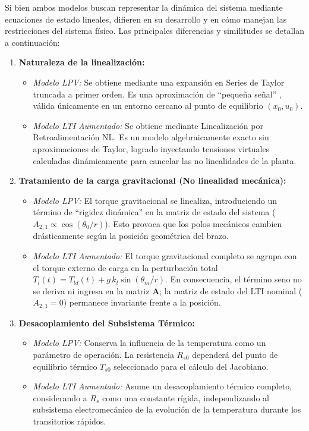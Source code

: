 \documentclass[12pt, a4paper,journal, onecolumn, compsoc]{IEEEtran}
\begin{document}
Si bien ambos modelos buscan representar la dinámica del sistema mediante ecuaciones de estado lineales, difieren en su desarrollo y en cómo manejan las restricciones del sistema físico. Las principales diferencias y similitudes se detallan a continuación:

\begin{enumerate}
    \item \textbf{Naturaleza de la linealización:}
    \begin{itemize}
        \item \textit{Modelo LPV:} Se obtiene mediante una expansión en Series de Taylor truncada a primer orden. Es una aproximación de ``pequeña señal'' \cite{franklin_feedback}, válida únicamente en un entorno cercano al punto de equilibrio $(x_0, u_0)$.
        \item \textit{Modelo LTI Aumentado:} Se obtiene mediante Linealización por Retroalimentación NL. Es un modelo algebraicamente exacto sin aproximaciones de Taylor, logrado inyectando tensiones virtuales calculadas dinámicamente para cancelar las no linealidades de la planta.
    \end{itemize}
    
    \item \textbf{Tratamiento de la carga gravitacional (No linealidad mecánica):}
    \begin{itemize}
        \item \textit{Modelo LPV:} El torque gravitacional se linealiza, introduciendo un término de ``rigidez dinámica'' en la matriz de estado del sistema ($A_{2,1} \propto \cos(\theta_0/r)$). Esto provoca que los polos mecánicos cambien drásticamente según la posición geométrica del brazo.
        \item \textit{Modelo LTI Aumentado:} El torque gravitacional completo se agrupa con el torque externo de carga en la perturbación total $T_l(t)=T_{ld}(t)+g\,k_l\sin(\theta_m/r)$. En consecuencia, el término seno no se deriva ni ingresa en la matriz $\mathbf{A}$; la matriz de estado del LTI nominal ($A_{2,1}=0$) permanece invariante frente a la posición.
    \end{itemize}

    \item \textbf{Desacoplamiento del Subsistema Térmico:}
    \begin{itemize}
        \item \textit{Modelo LPV:} Conserva la influencia de la temperatura como un parámetro de operación. La resistencia $R_{s0}$ dependerá del punto de equilibrio térmico $T_{s0}$ seleccionado para el cálculo del Jacobiano.
        \item \textit{Modelo LTI Aumentado:} Asume un desacoplamiento térmico completo, considerando a $R_s$ como una constante rígida, independizando al subsistema electromecánico de la evolución de la temperatura durante los transitorios rápidos.
    \end{itemize}


\end{enumerate}
\end{document}
